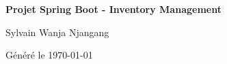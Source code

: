 \documentclass[12pt,a4paper]{article}
\begin{document}
\begin{titlepage}
    \centering
    \vspace*{3cm}
    {\Huge \textbf{Projet Spring Boot - Inventory Management} \par}
    \vspace{1cm}
    {\Large Sylvain Wanja Njangang \par}
    \vfill
    {\large Généré le \today}
\end{titlepage}

\tableofcontents
\newpage

\end{document}
